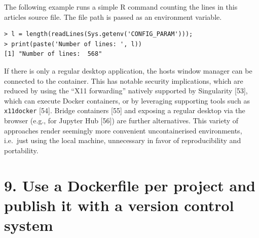 \documentclass[10pt,letterpaper]{article}
\newenvironment{Shaded}{\begin{snugshade}}{\end{snugshade}}
\newcommand{\BuiltInTok}[1]{#1}
\newcommand{\ExtensionTok}[1]{#1}
\newcommand{\NormalTok}[1]{#1}
\newcommand{\StringTok}[1]{\textcolor[rgb]{0.31,0.60,0.02}{#1}}
\newcommand{\VariableTok}[1]{\textcolor[rgb]{0.00,0.00,0.00}{#1}}
\begin{document}
The following example runs a simple R command counting the lines in this
articles source file. The file path is passed as an environment
variable.

\footnotesize

\begin{Shaded}
\end{Shaded}

\begin{verbatim}
> l = length(readLines(Sys.getenv('CONFIG_PARAM')));
> print(paste('Number of lines: ', l))
[1] "Number of lines:  568"
\end{verbatim}

\normalsize

If there is only a regular desktop application, the hosts window manager
can be connected to the container. This has notable security
implications, which are reduced by using the ``X11 forwarding'' natively
supported by Singularity {[}53{]}, which can execute Docker containers,
or by leveraging supporting tools such as \texttt{x11docker} {[}54{]}.
Bridge containers {[}55{]} and exposing a regular desktop via the
browser (e.g., for Jupyter Hub {[}56{]}) are further alternatives. This
variety of approaches render seemingly more convenient uncontainerised
environments, i.e.~just using the local machine, unnecessary in favor of
reproducibility and portability.

\hypertarget{use-a-dockerfile-per-project-and-publish-it-with-a-version-control-system}{%
\section*{9. Use a Dockerfile per project and publish it with a version
control
system}\label{use-a-dockerfile-per-project-and-publish-it-with-a-version-control-system}}
\end{document}
